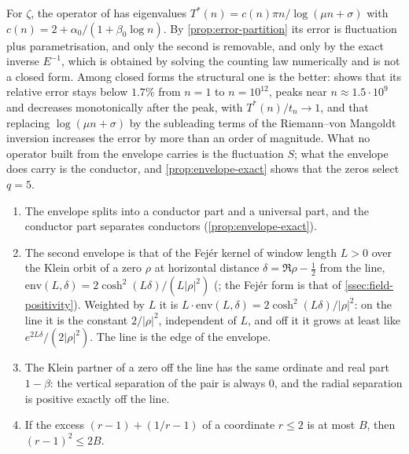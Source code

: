 \begin{remark}\label{rmk:two-errors}
For $\zeta$, the operator of \cite{gonzalez25hp} has eigenvalues
$T^*(n)=c(n)\pi n/\log(\mu n+\sigma)$ with $c(n)=2+\alpha_0/(1+\beta_0\log n)$.  By
\cref{prop:error-partition} its error is fluctuation plus parametrisation, and only the
second is removable, and only by the exact inverse $E^{-1}$, which is obtained by solving
the counting law numerically and is not a closed form.  Among closed forms the structural
one is the better: \cite{gonzalez25hp} shows that its relative error stays below $1.7\%$
from $n=1$ to $n=10^{12}$, peaks near $n\approx1.5\cdot10^9$ and decreases monotonically
after the peak, with $T^*(n)/t_n\to1$, and that replacing $\log(\mu n+\sigma)$ by the
subleading terms of the Riemann--von Mangoldt inversion increases the error by more than an
order of magnitude.  What no operator built from the envelope carries is the fluctuation
$S$; what the envelope does carry is the conductor, and \cref{prop:envelope-exact} shows
that the zeros select $q=5$.
\end{remark}

\begin{proposition}\label{prop:envelope-edge}
\begin{enumerate}[label=\textup{(\roman*)}]
  \item The envelope splits into a conductor part and a universal part, and the conductor
    part separates conductors (\cref{prop:envelope-exact}).
  \item The second envelope is that of the Fej\'er kernel of window length $L>0$ over the Klein orbit of a zero
    $\rho$ at horizontal distance $\delta=\Re\rho-\tfrac12$ from the line,
    $\mathrm{env}(L,\delta)=2\cosh^2(L\delta)/(L|\rho|^2)$ (; the Fej\'er form is that of
    \cref{ssec:field-positivity}).  Weighted by $L$ it is
    $L\cdot\mathrm{env}(L,\delta)=2\cosh^2(L\delta)/|\rho|^2$: on the line it is the
    constant $2/|\rho|^2$, independent of $L$, and off it it grows at least like
    $e^{2L\delta}/(2|\rho|^2)$.  The line is the edge of the envelope.
  \item The Klein partner of a zero off the line has the same ordinate and real part
    $1-\beta$: the vertical separation of the pair is always $0$, and the radial
    separation is positive exactly off the line.
  \item If the excess $(r-1)+(1/r-1)$ of a coordinate $r\le2$ is at most $B$, then
    $(r-1)^2\le2B$.
\end{enumerate}
%
\end{proposition}

